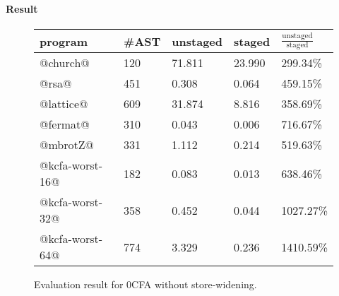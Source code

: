 \iffalse
We used the following benchmark programs:
\begin{itemize}
  \item \textbf{rsa}: The RSA public key encryption algorithm.
  \item \textbf{kcfa3}: A difficult benchmark for $k$-CFA.
  \item \textbf{church}: Church numerals with additions and mutiplications.
  \item \textbf{fermat}: Fermat and Solovay-Strassen primality testing.
  \item \textbf{kcfa-worst-case-}\textit{n}: 
    Benchmark programs that are supposed to be tough cases for $k$-CFA; 
    the number $n$ indicates the depth of nesting lambda terms.
\end{itemize}
\fi

\paragraph{Result}

\begin{figure}[h]
\tiny
\begin{tabular}{@{}lllll@{}}
\toprule
    program          &\#AST & unstaged   & staged     & $\frac{\text{unstaged}}{\text{staged}}$ \\ \midrule
    @church@         & 120  & 71.811     & 23.990     & 299.34\%          \\
    @rsa@            & 451  & 0.308      & 0.064      & 459.15\%          \\
    @lattice@        & 609  & 31.874     & 8.816      & 358.69\%          \\
    @fermat@         & 310  & 0.043      & 0.006      & 716.67\%          \\
    @mbrotZ@         & 331  & 1.112      & 0.214      & 519.63\%          \\
    @kcfa-worst-16@  & 182  & 0.083      & 0.013      & 638.46\%          \\
    @kcfa-worst-32@  & 358  & 0.452      & 0.044      & 1027.27\%         \\
    @kcfa-worst-64@  & 774  & 3.329      & 0.236      & 1410.59\%         \\
    \bottomrule
\end{tabular}
\caption{Evaluation result for 0CFA without store-widening.} \label{evaluation_result}
\end{figure}

